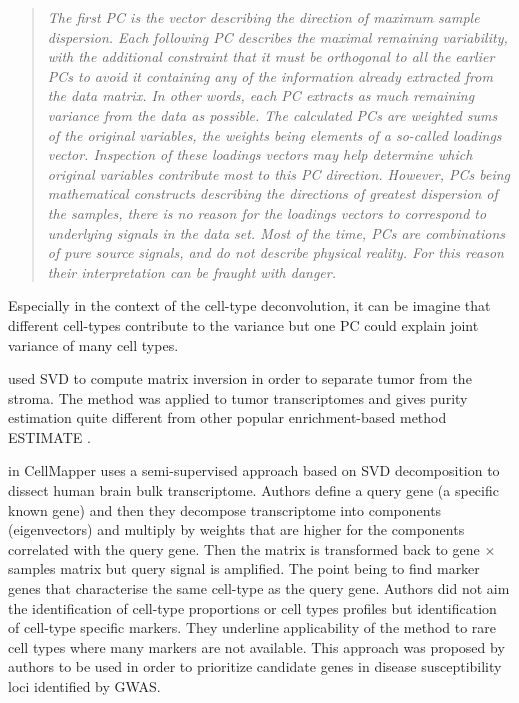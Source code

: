 \documentclass[12pt,]{book}
\theoremstyle{definition}
\theoremstyle{definition}
\theoremstyle{definition}
\theoremstyle{remark}
\begin{document}
\begin{quote}
\emph{The first PC is the vector describing the direction of maximum
sample dispersion. Each following PC describes the maximal remaining
variability, with the additional constraint that it must be orthogonal
to all the earlier PCs to avoid it containing any of the information
already extracted from the data matrix. In other words, each PC extracts
as much remaining variance from the data as possible. The calculated PCs
are weighted sums of the original variables, the weights being elements
of a so-called loadings vector. Inspection of these loadings vectors may
help determine which original variables contribute most to this PC
direction. However, PCs being mathematical constructs describing the
directions of greatest dispersion of the samples, there is no reason for
the loadings vectors to correspond to underlying signals in the data
set. Most of the time, PCs are combinations of pure source signals, and
do not describe physical reality. For this reason their interpretation
can be fraught with danger.}
\end{quote}

Especially in the context of the cell-type deconvolution, it can be
imagine that different cell-types contribute to the variance but one PC
could explain joint variance of many cell types.

\citet{Wang2015} used SVD to compute matrix inversion in order to
separate tumor from the stroma. The method was applied to tumor
transcriptomes and gives purity estimation quite different from other
popular enrichment-based method ESTIMATE \citep{Yoshihara2013}.

\citet{Nelms2016} in CellMapper uses a semi-supervised approach based on
SVD decomposition to dissect human brain bulk transcriptome. Authors
define a query gene (a specific known gene) and then they decompose
transcriptome into components (eigenvectors) and multiply by weights
that are higher for the components correlated with the query gene. Then
the matrix is transformed back to gene \(\times\) samples matrix but
query signal is amplified. The point being to find marker genes that
characterise the same cell-type as the query gene. Authors did not aim
the identification of cell-type proportions or cell types profiles but
identification of cell-type specific markers. They underline
applicability of the method to rare cell types where many markers are
not available. This approach was proposed by authors to be used in order
to prioritize candidate genes in disease susceptibility loci identified
by GWAS.
\end{document}
